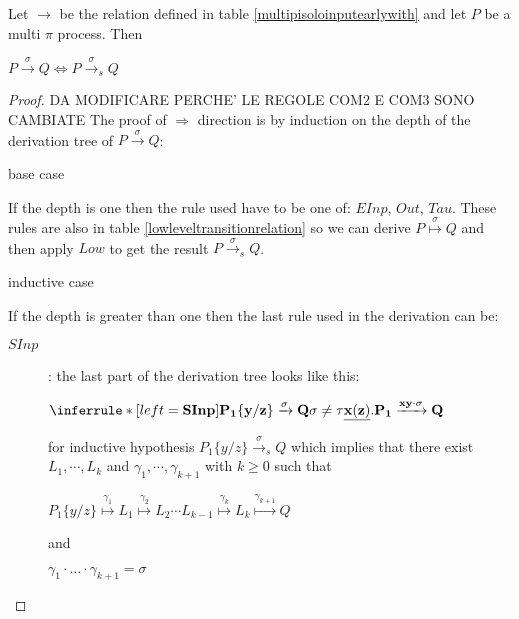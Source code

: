 \begin{proposition}
  Let $\rightarrow$ be the relation defined in table \ref{multipisoloinputearlywith} and let $P$ be a multi $\pi$ process. Then 
  \begin{center}
    $P\xrightarrow{\sigma} Q \Leftrightarrow P\xrightarrow{\sigma}_{s} Q$
  \end{center}
  \begin{proof}
    DA MODIFICARE PERCHE' LE REGOLE COM2 E COM3 SONO CAMBIATE 
    The proof of $\Rightarrow$ direction is by induction on the depth of the derivation tree of $P\xrightarrow{\sigma} Q$:
    \begin{description}
      \item[base case]
    \end{description}
	If the depth is one then the rule used have to be one of: $EInp$, $Out$, $Tau$. These rules are also in table \ref{lowleveltransitionrelation} so we can derive $P \stackrel{\sigma}{\longmapsto} Q$ and then apply $Low$ to get the result $P\xrightarrow{\sigma}_{s} Q$.
    \begin{description}
      \item[inductive case]
    \end{description}
	If the depth is greater than one then the last rule used in the derivation can be:
	\begin{description}
	  \item[$SInp$]: 
	    the last part of the derivation tree looks like this:
	    \begin{center}
	      $\inferrule* [left=\bf{SInp}]{
		  P_{1}\{y/z\} \xrightarrow{\sigma} Q
		\\
		  \sigma\neq \tau
	      }{
		\underline{x(z)}.P_{1} \xrightarrow{xy \cdot \sigma} Q
	      }$	      
	    \end{center}
	    for inductive hypothesis $P_{1}\{y/z\} \xrightarrow{\sigma}_{s} Q$ which implies that there exist $L_{1}, \cdots, L_{k}$ and $\gamma_{1}, \cdots, \gamma_{k+1}$ with $k\geq 0$ such that 
	    \begin{center}
	      $P_{1}\{y/z\} \stackrel{\gamma_{1}}{\longmapsto} L_{1}  \stackrel{\gamma_{2}}{\longmapsto} L_{2} \cdots L_{k-1} \stackrel{\gamma_{k}}{\longmapsto} L_{k} \stackrel{\gamma_{k+1}}{\longmapsto} Q$ 
	    \end{center}
	    and 
	    \begin{center}
	      $\gamma_{1} \cdot \ldots \cdot \gamma_{k+1} =  \sigma$
	    \end{center}

\end{description}
\end{proof}
\end{proposition}
